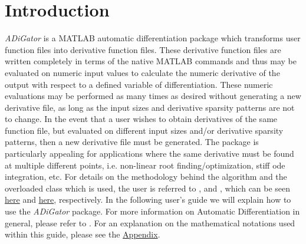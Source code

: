\documentclass[10pt,pdftex]{article}
\begin{document}
\renewcommand{\baselinestretch}{1}
\normalsize
\normalfont



\renewcommand{\baselinestretch}{1}

\normalsize
\normalfont
\clearpage
\tableofcontents
\clearpage
\section{Introduction}
\emph{ADiGator} is a MATLAB automatic differentiation package which transforms user function files into derivative function files. These derivative function files are written completely in terms of the native MATLAB commands and thus may be evaluated on numeric input values to calculate the numeric derivative of the output with respect to a defined variable of differentiation. These numeric evaluations may be performed as many times as desired without generating a new derivative file, as long as the input sizes and derivative sparsity patterns are not to change. In the event that a user wishes to obtain derivatives of the same function file, but evaluated on different input sizes and/or derivative sparsity patterns, then a new derivative file must be generated. The package is particularly appealing for applications where the same derivative must be found at multiple different points, i.e. non-linear root finding/optimization, stiff ode integration, etc. For details on the methodology behind the algorithm and the overloaded class which is used, the user is referred to \cite{Weinstein2014}, and \cite{Patterson2013}, which can be seen \href{http://vdol.mae.ufl.edu/JournalPublications/TOMS-2013-0067.pdf}{here} and \href{http://vdol.mae.ufl.edu/JournalPublications/TOMS-2011-0055.pdf}{here}, respectively.
In the following user's guide we will explain how to use the \emph{ADiGator} package. For more information on Automatic Differentiation in general, please refer to  \cite{Griewank1}. For an explanation on the mathematical notations used within this guide, please see the \hyperlink{Appendix}{Appendix}.
\end{document}
